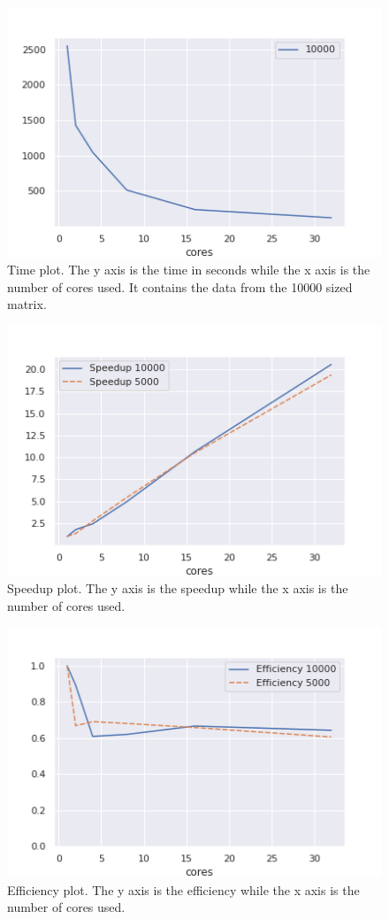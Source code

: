 \documentclass[11pt, a4paper]{article}
\begin{document}
	\begin{figure}[H]
		\centering
		\includegraphics[width=0.7\linewidth]{plots/time-2}
		\caption[Time Plot]{Time plot. The y axis is the time in seconds while the x axis is the number of cores used. It contains the data from the 10000 sized matrix.}
		\label{fig:time-2}
	\end{figure}
	
	\begin{figure}[H]
		\centering
		\includegraphics[width=0.7\linewidth]{plots/speedup}
		\caption[Speedup plot]{Speedup plot. The y axis is the speedup while the x axis is the number of cores used.}
		\label{fig:speedup}
	\end{figure}
	
	\begin{figure}[H]
		\centering
		\includegraphics[width=0.7\linewidth]{plots/efficiency}
		\caption[Efficiency plot]{Efficiency plot. The y axis is the efficiency while the x axis is the number of cores used.}
		\label{fig:efficiency}
	\end{figure}
\end{document}
